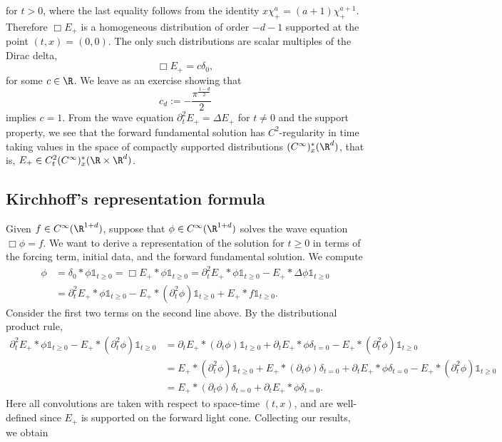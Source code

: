 \documentclass[reqno]{amsart}
\theoremstyle{definition}
\theoremstyle{remark}
\begin{document}
for $t > 0$, where the last equality follows from the identity $x \chi^a_+ = (a + 1) \chi^{a + 1}_+$. Therefore $\Box E_+$ is a homogeneous distribution of order $- d - 1$ supported at the point $(t, x) = (0, 0)$. The only such distributions are scalar multiples of the Dirac delta, 
	\[ \Box E_+ = c \delta_0, \]
for some $c \in \R$. We leave as an exercise showing that 
	\[ c_d := -\frac{\pi^{\frac{1 - d}{2}}}{2} \]
implies $c = 1$. From the wave equation $\partial_t^2 E_+ = \Delta E_+$ for $t \neq 0$ and the support property, we see that the forward fundamental solution has $C^2$-regularity in time taking values in the space of compactly supported distributions $(C^\infty)^*_x (\R^d)$, that is, $E_+ \in C^2_t (C^\infty)^*_x (\R \times \R^d)$.

\subsection{Kirchhoff's representation formula}

Given $f \in C^\infty (\R^{1 + d})$, suppose that $\phi \in C^\infty (\R^{1 + d})$ solves the wave equation $\Box \phi = f$. We want to derive a representation of the solution for $t \geq 0$ in terms of the forcing term, initial data, and the forward fundamental solution. We compute
	\begin{align*}
		\phi
			&= \delta_0 * \phi \mathbb 1_{t \geq 0} = \Box E_+ * \phi \mathbb 1_{t \geq 0} = \partial_t^2 E_+ * \phi \mathbb 1_{t \geq 0} - E_+ * \Delta \phi \mathbb 1_{t \geq 0} \\
			&= \partial_t^2 E_+ * \phi \mathbb 1_{t \geq 0}  - E_+ * (\partial_t^2 \phi) \mathbb 1_{t \geq 0} + E_+ * f \mathbb 1_{t \geq 0}. 
	\end{align*}
Consider the first two terms on the second line above. By the distributional product rule, 
	\begin{align*}
		\partial_t^2 E_+ * \phi \mathbb 1_{t \geq 0}  - E_+ * (\partial_t^2 \phi) \mathbb 1_{t \geq 0} 
			&= \partial_t E_+ * (\partial_t \phi) \mathbb 1_{t \geq 0} + \partial_t E_+ * \phi \delta_{t = 0} - E_+ * (\partial_t^2 \phi) \mathbb 1_{t \geq 0} \\
			&= E_+ * (\partial_t^2 \phi) \mathbb 1_{t \geq 0} + E_+ * (\partial_t \phi) \delta_{t = 0} + \partial_t E_+ * \phi \delta_{t = 0} - E_+ * (\partial_t^2 \phi) \mathbb 1_{t \geq 0} \\
			&= E_+ * (\partial_t \phi) \delta_{t = 0} + \partial_t E_+ * \phi \delta_{t = 0}.
	\end{align*}
Here all convolutions are taken with respect to space-time $(t, x)$, and are well-defined since $E_+$ is supported on the forward light cone. Collecting our results, we obtain
	
\end{document}
